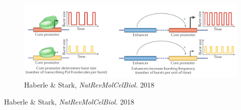 \begin{figure}
\centering
\includegraphics[width=\textwidth]{../_resources/Screenshot_2022-10-10_at_10-50-43.png}
\caption{Haberle \& Stark, \emph{NatRevMolCelBiol.} 2018}
\end{figure}

Haberle \& Stark, \emph{NatRevMolCelBiol.} 2018

